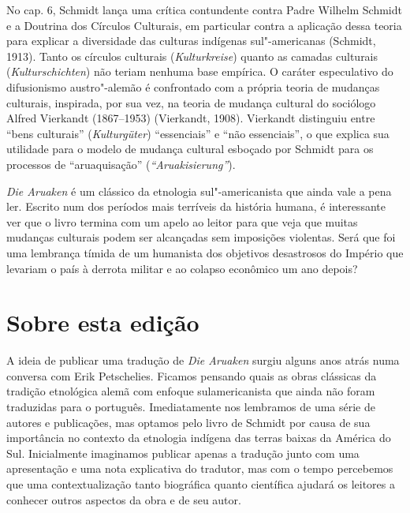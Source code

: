 No cap. 6, Schmidt lança uma crítica contundente contra Padre Wilhelm
Schmidt e a Doutrina dos Círculos Culturais, em particular contra a
aplicação dessa teoria para explicar a diversidade das culturas
indígenas sul"-americanas (Schmidt, 1913). Tanto os círculos culturais
(\emph{Kulturkreise}) quanto as camadas culturais
(\emph{Kulturschichten}) não teriam nenhuma base empírica. O caráter
especulativo do difusionismo austro"-alemão é confrontado com a própria
teoria de mudanças culturais, inspirada, por sua vez, na teoria de
mudança cultural do sociólogo Alfred Vierkandt (1867--1953) (Vierkandt,
1908). Vierkandt distinguiu entre ``bens culturais''
(\emph{Kulturgüter}) ``essenciais'' e ``não essenciais'', o que explica
sua utilidade para o modelo de mudança cultural esboçado por Schmidt
para os processos de ``aruaquisação'' (\emph{``Aruakisierung''}).

\emph{Die Aruaken} é um clássico da etnologia sul"-americanista que ainda
vale a pena ler. Escrito num dos períodos mais terríveis da história
humana, é interessante ver que o livro termina com um apelo ao leitor
para que veja que muitas mudanças culturais podem ser alcançadas sem
imposições violentas. Será que foi uma lembrança tímida de um humanista
dos objetivos desastrosos do Império que levariam o país à derrota
militar e ao colapso econômico um ano depois?

\section{Sobre esta edição}

A ideia de publicar uma tradução de \emph{Die Aruaken} surgiu alguns
anos atrás numa conversa com Erik Petschelies. Ficamos pensando quais as
obras clássicas da tradição etnológica alemã com enfoque sulamericanista
que ainda não foram traduzidas para o português. Imediatamente nos
lembramos de uma série de autores e publicações, mas optamos pelo livro
de Schmidt por causa de sua importância no contexto da etnologia
indígena das terras baixas da América do Sul. Inicialmente imaginamos
publicar apenas a tradução junto com uma apresentação e uma nota
explicativa do tradutor, mas com o tempo percebemos que uma
contextualização tanto biográfica quanto científica ajudará os leitores
a conhecer outros aspectos da obra e de seu autor.

